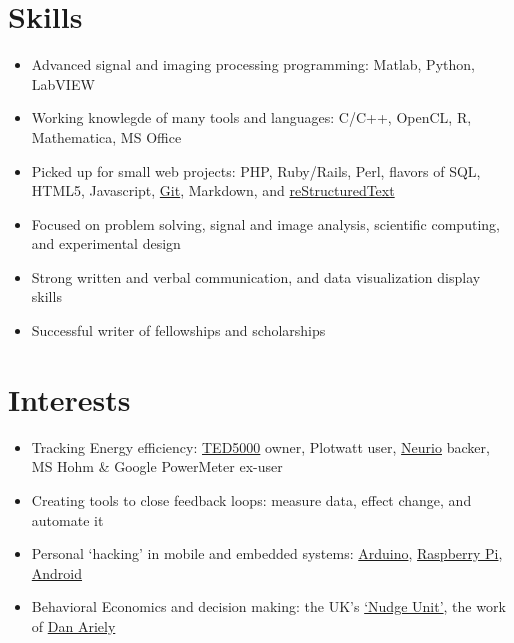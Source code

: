 \documentclass[letterpaper,10pt,english]{sphinxmanual}
\begin{document}
\section{Skills}
\label{resume:skills}\begin{itemize}
\item {} 
Advanced signal and imaging processing programming: Matlab, Python,
LabVIEW

\item {} 
Working knowlegde of many tools and languages: C/C++, OpenCL, R,
Mathematica, MS Office

\item {} 
Picked up for small web projects: PHP, Ruby/Rails, Perl, flavors of
SQL, HTML5, Javascript, \href{http://git-scm.com/}{Git}, Markdown, and
\href{http://docutils.sf.net/rst.html}{reStructuredText}

\item {} 
Focused on problem solving, signal and image analysis, scientific
computing, and experimental design

\item {} 
Strong written and verbal communication, and data visualization
display skills

\item {} 
Successful writer of fellowships and scholarships

\end{itemize}


\section{Interests}
\label{resume:interests}\begin{itemize}
\item {} 
Tracking Energy efficiency:
\href{http://www.theenergydetective.com/}{TED5000} owner,
Plotwatt user, \href{https://neur.io/}{Neurio}
backer, MS Hohm \& Google
PowerMeter ex-user

\item {} 
Creating tools to close feedback loops: measure data, effect change,
and automate it

\item {} 
Personal `hacking' in mobile and embedded systems:
\href{http://www.arduino.cc/}{Arduino}, \href{http://www.raspberrypi.org/}{Raspberry
Pi},
\href{http://www.android.com/}{Android}

\item {} 
Behavioral Economics and decision making: the UK's \href{https://www.gov.uk/government/organisations/behavioural-insights-team}{`Nudge
Unit'},
the work of \href{http://danariely.com/}{Dan Ariely}

\end{itemize}
\end{document}
